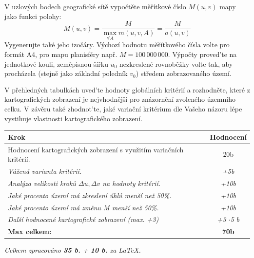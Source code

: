 V uzlových bodech geografické sítě vypočtěte měřítkové číslo $M(u,v)$ mapy jako funkci polohy: 
\begin{equation*}
	M(u,v)=\frac{M}{\max_{\forall A}m(u,v,A)}=\frac{M}{a(u,v)} 
\end{equation*}
Vygenerujte také jeho izočáry. 
Výchozí hodnotu měřítkového čísla volte pro formát A4, pro mapu planisféry např. $M=100\,000\,000$.
Výpočty proved'te na jednotkové kouli, zeměpisnou šířku $u_{0}$ nezkreslené rovnoběžky volte tak, aby procházela (stejně jako základní poledník $v_{0}$) středem zobrazovaného území. 

V přehledných tabulkách uved'te hodnoty globálních kritérií a rozhodněte, které z kartografických zobrazení je nejvhodnější pro znázornění zvoleného územního celku. 
 V závěru také zhodnot'te, jaké variační kritérium dle Vašeho názoru lépe vystihuje vlastnosti kartografického zobrazení.



\noindent
\begin{tabularx}{\textwidth}{|X|c|}
    \hline
    \textbf{Krok} & \textbf{Hodnocení} \\
    \hline\hline
    {Hodnocení kartografických zobrazení s využitím variačních kritérií.} \cellcolor[HTML]{94F29E} & 20b \\
    \hline
    \textit{Vážená varianta kritérií.} \cellcolor[HTML]{94F29E} & \textit{+5b} \\
    \hline
    \textit{Analýza velikosti kroků $\Delta u, \Delta v$ na hodnoty kritérií.}  & \textit{+10b} \\
    \hline
    \textit{Jaké procento území má zkreslení úhlů menší než 50\%.} & \textit{+10b} \\
    \hline
    \textit{Jaké procento území má změnu M menší než 50\%.}  \cellcolor[HTML]{94F29E} & \textit{+10b} \\
    \hline
    \textit{Další hodnocené kartografické zobrazení (max. +3)}  & \textit{+3 $\cdot$5 b} \\
    \hline
    \textbf{Max celkem:} & \textbf{70b} \\
    \hline
    
\end{tabularx}

\textit{Celkem zpracováno \textbf{35 b.} + \textbf{10 b.} za LaTeX.}




